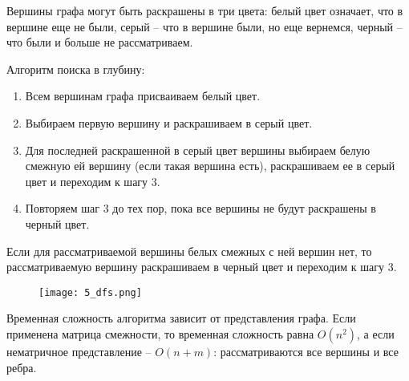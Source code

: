 Вершины графа могут быть раскрашены в три цвета: белый цвет означает, что
в вершине еще не были, серый – что в вершине были, но еще вернемся, черный
– что были и больше не рассматриваем.

Алгоритм поиска в глубину:
\begin{enumerate}[left=0.0em, labelsep=1em, topsep=0em, itemsep=0pt, parsep=0.5em]
    \item Всем вершинам графа присваиваем белый цвет.
    \item Выбираем первую вершину и раскрашиваем в серый цвет.
    \item Для последней раскрашенной в серый цвет вершины выбираем белую
    смежную ей вершину (если такая вершина есть), раскрашиваем ее в серый цвет
    и переходим к шагу 3.
    \item Повторяем шаг 3 до тех пор, пока все вершины не будут раскрашены в
    черный цвет.
\end{enumerate}

Если для рассматриваемой вершины белых смежных с ней вершин нет, то
рассматриваемую вершину раскрашиваем в черный цвет и переходим к шагу
3.

\begin{figure}[h]
    \centering
    \texttt{[image: 5\_dfs.png]}
\end{figure}

Временная сложность алгоритма зависит от представления графа. Если
применена матрица смежности, то временная сложность равна $O(n^2)$, а если
нематричное представление -- $O(n+m)$: рассматриваются все вершины и все ребра.